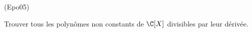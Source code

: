 \begin{tiny}(Epo05)\end{tiny} Trouver tous les polyn{\^o}mes non constants de $\C[X] $ divisibles par leur d{\'e}riv{\'e}e.